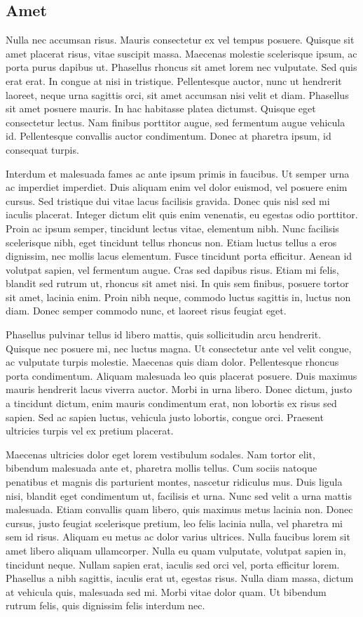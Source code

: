 \subsection{Amet} %
\label{sub:amet}
Nulla nec accumsan risus. Mauris consectetur ex vel tempus posuere. Quisque sit amet placerat risus, vitae suscipit massa. Maecenas molestie scelerisque ipsum, ac porta purus dapibus ut. Phasellus rhoncus sit amet lorem nec vulputate. Sed quis erat erat. In congue at nisi in tristique. Pellentesque auctor, nunc ut hendrerit laoreet, neque urna sagittis orci, sit amet accumsan nisi velit et diam. Phasellus sit amet posuere mauris. In hac habitasse platea dictumst. Quisque eget consectetur lectus. Nam finibus porttitor augue, sed fermentum augue vehicula id. Pellentesque convallis auctor condimentum. Donec at pharetra ipsum, id consequat turpis.

Interdum et malesuada fames ac ante ipsum primis in faucibus. Ut semper urna ac imperdiet imperdiet. Duis aliquam enim vel dolor euismod, vel posuere enim cursus. Sed tristique dui vitae lacus facilisis gravida. Donec quis nisl sed mi iaculis placerat. Integer dictum elit quis enim venenatis, eu egestas odio porttitor. Proin ac ipsum semper, tincidunt lectus vitae, elementum nibh. Nunc facilisis scelerisque nibh, eget tincidunt tellus rhoncus non. Etiam luctus tellus a eros dignissim, nec mollis lacus elementum. Fusce tincidunt porta efficitur. Aenean id volutpat sapien, vel fermentum augue. Cras sed dapibus risus. Etiam mi felis, blandit sed rutrum ut, rhoncus sit amet nisi. In quis sem finibus, posuere tortor sit amet, lacinia enim. Proin nibh neque, commodo luctus sagittis in, luctus non diam. Donec semper commodo nunc, et laoreet risus feugiat eget.

Phasellus pulvinar tellus id libero mattis, quis sollicitudin arcu hendrerit. Quisque nec posuere mi, nec luctus magna. Ut consectetur ante vel velit congue, ac vulputate turpis molestie. Maecenas quis diam dolor. Pellentesque rhoncus porta condimentum. Aliquam malesuada leo quis placerat posuere. Duis maximus mauris hendrerit lacus viverra auctor. Morbi in urna libero. Donec dictum, justo a tincidunt dictum, enim mauris condimentum erat, non lobortis ex risus sed sapien. Sed ac sapien luctus, vehicula justo lobortis, congue orci. Praesent ultricies turpis vel ex pretium placerat.

Maecenas ultricies dolor eget lorem vestibulum sodales. Nam tortor elit, bibendum malesuada ante et, pharetra mollis tellus. Cum sociis natoque penatibus et magnis dis parturient montes, nascetur ridiculus mus. Duis ligula nisi, blandit eget condimentum ut, facilisis et urna. Nunc sed velit a urna mattis malesuada. Etiam convallis quam libero, quis maximus metus lacinia non. Donec cursus, justo feugiat scelerisque pretium, leo felis lacinia nulla, vel pharetra mi sem id risus. Aliquam eu metus ac dolor varius ultrices. Nulla faucibus lorem sit amet libero aliquam ullamcorper. Nulla eu quam vulputate, volutpat sapien in, tincidunt neque. Nullam sapien erat, iaculis sed orci vel, porta efficitur lorem. Phasellus a nibh sagittis, iaculis erat ut, egestas risus. Nulla diam massa, dictum at vehicula quis, malesuada sed mi. Morbi vitae dolor quam. Ut bibendum rutrum felis, quis dignissim felis interdum nec.

